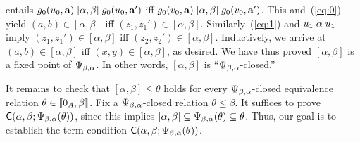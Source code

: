     entails
    $g_0(u_0, \mathbf{a}) \mathrel{[\alpha, \beta]} g_0(u_0, \mathbf{a}')$
    iff 
    $g_0(v_0, \mathbf{a}) \mathrel{[\alpha, \beta]} g_0(v_0, \mathbf{a}')$.
    This and~(\ref{eq:0}) yield
    $(a,b)\in [\alpha, \beta]$ iff
    $(z_1,z_1')\in [\alpha, \beta]$.
    Similarly~(\ref{eq:1}) and $u_1 \mathrel{\alpha} u_1$ imply
    $(z_1,z_1')\in [\alpha, \beta]$ iff
    $(z_2,z_2')\in [\alpha, \beta]$.  Inductively, we arrive at 
    $(a,b)\in [\alpha, \beta]$ iff $(x,y)\in [\alpha, \beta]$, as desired.
    We have thus proved $[\alpha, \beta]$ is a fixed point of $\Psi_{\beta, \alpha}$.
    In other words, 
    $[\alpha, \beta]$ is ``$\Psi_{\beta, \alpha}$-closed.''

    It remains to check that $[\alpha, \beta] \leq \theta$ holds
    for every $\Psi_{\beta, \alpha}$-closed equivalence relation $\theta \in \llbracket 0_A, \beta\rrbracket$. 
    Fix a $\Psi_{\beta, \alpha}$-closed relation $\theta \leq \beta$. %
    It suffices to prove $\mathsf{C}(\alpha, \beta; \Psi_{\beta, \alpha}(\theta))$, since this implies 
    $[\alpha, \beta] \subseteq \Psi_{\beta, \alpha}(\theta) \subseteq \theta$.
    Thus, our goal is to establish the term condition
    $\mathsf{C}(\alpha, \beta; \Psi_{\beta, \alpha}(\theta))$.


